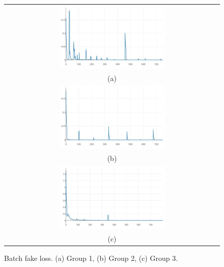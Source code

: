 \documentclass[10pt,twocolumn,letterpaper]{article}
\begin{document}
\begin{figure}%
\centering\begin{tabular}{c}
\includegraphics[width=0.5\textwidth]{fig12-a}\\
(a)\\[3ex]%
\includegraphics[width=0.5\textwidth]{fig12-b}\\
(b)\\[3ex]
\includegraphics[width=0.5\textwidth]{fig12-c}\\
(c)
\end{tabular}
\caption{Batch fake loss. (a) Group 1, (b) Group 2, (c) Group 3.}%
\label{fig12}%
\end{figure}
\end{document}

